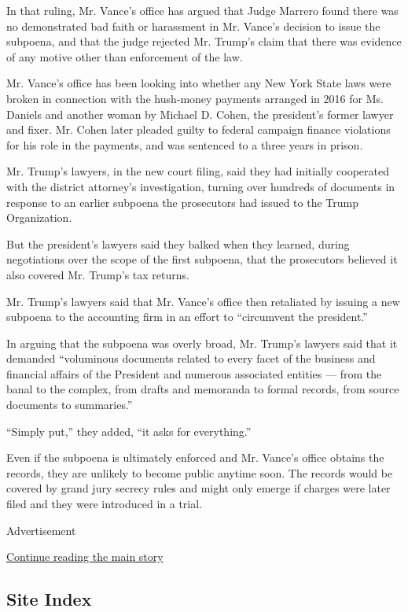 In that ruling, Mr. Vance's office has argued that Judge Marrero found
there was no demonstrated bad faith or harassment in Mr. Vance's
decision to issue the subpoena, and that the judge rejected Mr. Trump's
claim that there was evidence of any motive other than enforcement of
the law.

Mr. Vance's office has been looking into whether any New York State laws
were broken in connection with the hush-money payments arranged in 2016
for Ms. Daniels and another woman by Michael D. Cohen, the president's
former lawyer and fixer. Mr. Cohen later pleaded guilty to federal
campaign finance violations for his role in the payments, and was
sentenced to a three years in prison.

Mr. Trump's lawyers, in the new court filing, said they had initially
cooperated with the district attorney's investigation, turning over
hundreds of documents in response to an earlier subpoena the prosecutors
had issued to the Trump Organization.

But the president's lawyers said they balked when they learned, during
negotiations over the scope of the first subpoena, that the prosecutors
believed it also covered Mr. Trump's tax returns.

Mr. Trump's lawyers said that Mr. Vance's office then retaliated by
issuing a new subpoena to the accounting firm in an effort to
``circumvent the president.''

In arguing that the subpoena was overly broad, Mr. Trump's lawyers said
that it demanded ``voluminous documents related to every facet of the
business and financial affairs of the President and numerous associated
entities --- from the banal to the complex, from drafts and memoranda to
formal records, from source documents to summaries.''

``Simply put,'' they added, ``it asks for everything.''

Even if the subpoena is ultimately enforced and Mr. Vance's office
obtains the records, they are unlikely to become public anytime soon.
The records would be covered by grand jury secrecy rules and might only
emerge if charges were later filed and they were introduced in a trial.

Advertisement

\protect\hyperlink{after-bottom}{Continue reading the main story}

\hypertarget{site-index}{%
\subsection{Site Index}\label{site-index}}

